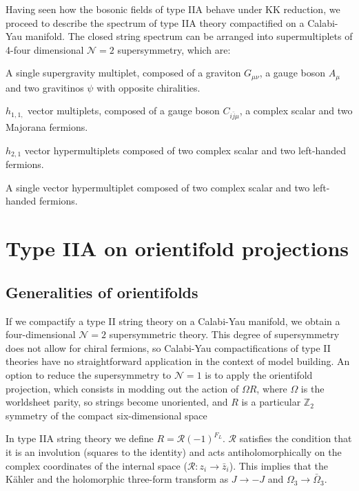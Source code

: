 Having seen how the bosonic fields of type IIA behave under KK reduction, we proceed to describe the
spectrum of type IIA theory compactified on a Calabi-Yau manifold.
The closed string spectrum can be arranged into supermultiplets of 4-four dimensional $\mathcal N=2$ supersymmetry,
which are:

A single supergravity multiplet, composed of a graviton $G_{\mu\nu}$, a gauge boson $A_\mu$ and two gravitinos $\psi$ with opposite chiralities. 

$h_{1,1,}$ vector multiplets, composed of a gauge boson $C_{i\bar j\mu}$, a complex scalar and two Majorana fermions.

$h_{2,1}$ vector hypermultiplets composed of two complex scalar and two left-handed fermions.

A single vector hypermultiplet composed of two complex scalar and two left-handed fermions.

\section{Type IIA on orientifold projections}

\subsection{Generalities of orientifolds}
If we compactify a type II string theory on a Calabi-Yau manifold, we  obtain a four-dimensional
$\mathcal N=2$ supersymmetric theory.
This degree of supersymmetry does not allow for chiral fermions, so Calabi-Yau compactifications
of type II theories have no straightforward application in the context of model building.
An option to reduce the supersymmetry to $\mathcal N=1$  is to apply the orientifold
projection, which consists in modding out the action of $\Omega R$,
where $\Omega$ is the worldsheet parity, so strings become unoriented, and
$R$ is a particular $\mathbb Z_2$ symmetry of the compact six-dimensional space

In type IIA string theory we define $R=\mathcal R (-1)^{F_L}$.
$\mathcal R$ satisfies the condition that it is an involution (squares to the identity) and 
acts antiholomorphically on the complex coordinates of the internal space ($\mathcal R: z_i \to \bar z_i$).
This implies that the Kähler and the holomorphic three-form transform as $J\to -J$ and $\Omega_3 \to \bar \Omega_3$.



